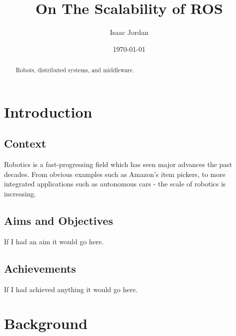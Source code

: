 \documentclass{l4proj}
\begin{document}
\title{On The Scalability of ROS}
\author{Isaac Jordan}
\date{\today}
\maketitle

\begin{abstract}
Robots, distributed systems, and middleware.
\end{abstract}

\educationalconsent
%
%
\tableofcontents

\chapter{Introduction}

\section{Context}

Robotics is a fast-progressing field which has seen major advances the past decades. From obvious examples such as Amazon's item pickers, to more integrated applications such as autonomous cars - the scale of robotics is increasing.

\section{Aims and Objectives}

If I had an aim it would go here.

\section{Achievements}

If I had achieved anything it would go here.




\chapter{Background}
\end{document}
